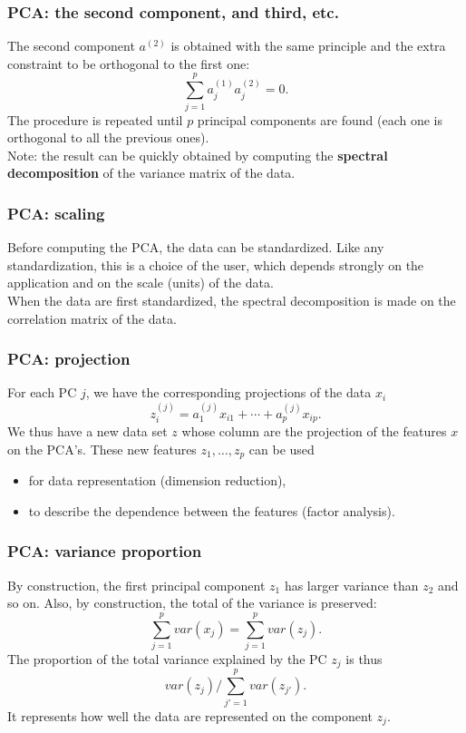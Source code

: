 \begin{frame}
\frametitle{PCA: the second component, and third, etc.}
The second component $a^{(2)}$ is obtained with the same principle and the extra constraint to be orthogonal to the first one:
$$
\sum_{j=1}^p a^{(1)}_j a^{(2)}_j = 0.
$$
The procedure is repeated until $p$ principal components are found (each one is orthogonal to all the previous ones). \\
\vspace{0.3cm}
Note: the result can be quickly obtained by computing the {\bf spectral decomposition} of the variance matrix of the data. 
\end{frame}
\begin{frame}
\frametitle{PCA: scaling}
Before computing the PCA, the data can be standardized. Like any standardization, this is a choice of the user, which depends strongly on the application and on the scale (units) of the data. \\
\vspace{0.3cm}
When the data are first standardized, the spectral decomposition is made on the correlation matrix of the data. 
\end{frame}
\begin{frame}
\frametitle{PCA: projection}
For each PC $j$, we have the corresponding projections of the data $x_i$
$$
z_i^{(j)} = a^{(j)}_1 x_{i1} + \cdots + a^{(j)}_p x_{ip}.
$$
We thus have a new data set $z$ whose column are the projection of the features $x$ on the PCA's. These new features $z_1, \ldots, z_p$ can be used 
\begin{itemize}
\item for data representation (dimension reduction),
\item to describe the dependence between the features (factor analysis).  
\end{itemize}
\end{frame}
\begin{frame}
\frametitle{PCA: variance proportion}
By construction, the first principal component $z_1$ has larger variance than $z_2$ and so on. Also, by construction, the total of the variance is preserved:
$$
\sum_{j=1}^p var(x_j) = \sum_{j=1}^p var(z_j).
$$
The proportion of the total variance explained by the PC $z_j$ is thus
$$
var(z_j)/\sum_{j'=1}^p var(z_{j'}).
$$
It represents how well the data are represented on the component $z_j$.
\end{frame}
